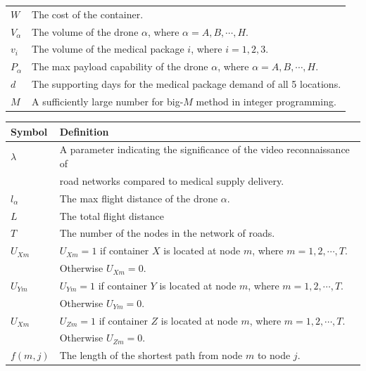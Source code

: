 \documentclass{mcmthesis}
\begin{document}
\begin{tabular}{ll}
	 $W$& The cost of the container.\\
	
	 $V_\alpha$& The volume of the drone $\alpha$, where $\alpha=A,B,\cdots,H$.\\
	
	 $v_i$& The volume of the medical package $i$, where $i=1,2,3$.\\
	
	 $P_\alpha$& The max payload capability of the drone $\alpha$, where $\alpha=A,B,\cdots,H$.\\
	
	 $d$& The supporting days for the medical package demand of all 5 locations.\\
	
	 $M$& A sufficiently large number for big-$M$ method in integer programming.\\ 
	\hline
\end{tabular}


\begin{tabular}{ll}
	\hline
	Symbol&  Definition\\
	\hline	 
	 $\lambda$& A parameter indicating the significance of the video reconnaissance of\\
	 & road networks compared to medical supply delivery. \\
	 
	 $l_\alpha$& The max flight distance of the drone $\alpha$.\\
	 
	 $L$& The total flight distance \\
	 
	 $T$& The number of the nodes in the network of roads.\\
	 
	 $U_{Xm}$& $U_{Xm}=1$ if container $X$ is located at node $m$, where $m=1,2,\cdots,T$.\\ & Otherwise $U_{Xm}=0$.\\
	 
	 $U_{Ym}$& $U_{Ym}=1$ if container $Y$ is located at node $m$, where $m=1,2,\cdots,T$.\\ &Otherwise $U_{Ym}=0$.\\
	 
	 $U_{Xm}$& $U_{Zm}=1$ if container $Z$ is located at node $m$, where $m=1,2,\cdots,T$.\\ &Otherwise $U_{Zm}=0$.\\
	 
	$f(m,j)$& The length of the shortest path from node $m$ to node $j$.\\
	\hline
\end{tabular}
\end{document}
